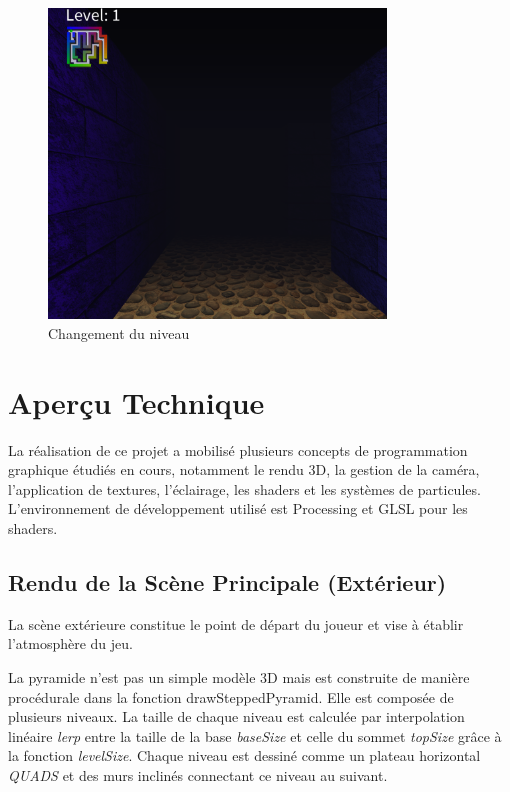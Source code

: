 \documentclass[12pt,oneside,letterpaper]{article}
\begin{document}
\begin{figure}[H]
    \centering
    \includegraphics[width=0.8\textwidth]{figures/level1.png}
    \caption{Changement du niveau}
\end{figure}

\section{Aperçu Technique}
La réalisation de ce projet a mobilisé plusieurs concepts de programmation graphique étudiés en cours, notamment le rendu 3D, la gestion de la caméra, l'application de textures, l'éclairage, les shaders et les systèmes de particules. L'environnement de développement utilisé est Processing et GLSL pour les shaders.

\subsection{Rendu de la Scène Principale (Extérieur)}
La scène extérieure constitue le point de départ du joueur et vise à établir l'atmosphère du jeu.

La pyramide n'est pas un simple modèle 3D mais est construite de manière procédurale dans la fonction drawSteppedPyramid. Elle est composée de plusieurs niveaux. La taille de chaque niveau est calculée par interpolation linéaire \textit{lerp} entre la taille de la base \textit{baseSize} et celle du sommet \textit{topSize} grâce à la fonction \textit{levelSize}. Chaque niveau est dessiné comme un plateau horizontal \textit{QUADS} et des murs inclinés connectant ce niveau au suivant.
\end{document}
